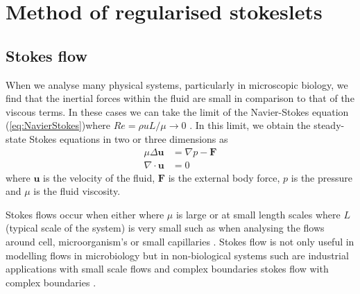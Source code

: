 \section{Method of regularised stokeslets} \label{sec:MRS}
\subsection{Stokes flow}
When we analyse many physical systems, particularly in microscopic biology, we find that the inertial forces within the fluid are small in comparison to that of the viscous terms. In these cases we can take the limit of the Navier-Stokes equation (\cref{eq:NavierStokes})where $Re=\rho u L/\mu \to 0 $ \cite{Trombley2019BasicFlows}. In this limit, we obtain the steady-state Stokes equations in two or three dimensions as 
\begin{subequations}
\label{eq:StokesFlow}
\begin{align}
    \mu\Delta\boldsymbol{u} &= \nabla p - \boldsymbol{F} \label{eq:StokesFlow1} \\
    \nabla \cdot \boldsymbol{u} &= 0 \label{eq:StokesFlow2}
\end{align}
\end{subequations}
where $\bm{u}$ is the velocity of the fluid, $\bm{F}$ is the external body force, $p$ is the pressure and $\mu$ is the fluid viscosity.

Stokes flows occur when either where $\mu$ is large or at small length scales where $L$ (typical scale of the system) is very small such as when analysing the flows around cell, microorganism's or small capillaries \cite{Blake1972AOrganisms, Higdon1979APropulsion, Smith2009MathematicalFluids}. Stokes flow is not only useful in modelling flows in microbiology but in non-biological systems such are industrial applications with small scale flows and complex boundaries stokes flow with complex boundaries \cite{Liron1978StokesPipe, Liron1976StokesPlates}.

